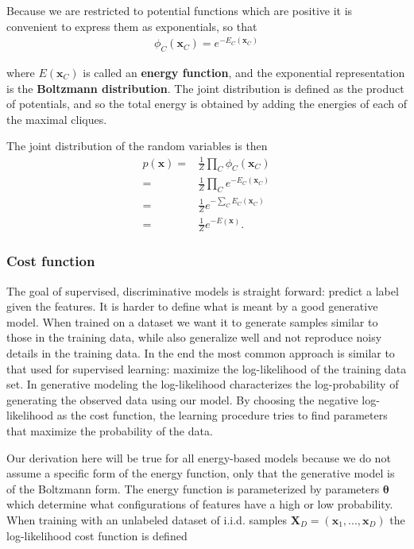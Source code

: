 \documentclass[twoside,english]{uiofysmaster}
\begin{document}
Because we are restricted to potential functions which are positive it is convenient to express them as exponentials, so that
\begin{align}
	\phi_C (\bm{x}_C) = e^{-E_C(\bm{x}_C)}
\end{align}

where $E(\bm{x}_C)$ is called an \textbf{energy function}, and the exponential representation is the \textbf{Boltzmann distribution}. The joint distribution is defined as the product of potentials, and so the total energy is obtained by adding the energies of each of the maximal cliques.

The joint distribution of the random variables is then
\begin{align}
	p(\bm{x}) =& \frac{1}{Z} \prod_C \phi_C (\bm{x}_C) \nonumber \\
	=& \frac{1}{Z} \prod_C e^{-E_C(\bm{x}_C)} \nonumber \\
	=& \frac{1}{Z} e^{-\sum_C E_C(\bm{x}_C)} \nonumber \\
	=& \frac{1}{Z} e^{-E(\bm{x})}.
\end{align} 


\subsubsection{Cost function}
\label{sec:UnsupervisedCostfunction}
The goal of supervised, discriminative models is straight forward: predict a label given the features. It is harder to define what is meant by a good generative model. When trained on a dataset we want it to generate samples similar to those in the training data, while also generalize well and not reproduce noisy details in the training data. In the end the most common approach is similar to that used for supervised learning: maximize the log-likelihood of the training data set. In generative modeling the log-likelihood characterizes the log-probability of generating the observed data using our model. By choosing the negative log-likelihood as the cost function, the learning procedure tries to find parameters that maximize the probability of the data. 



Our derivation here will be true for all energy-based models because we do not assume a specific form of the energy function, only that the generative model is of the Boltzmann form. The energy function is parameterized by parameters $\bm{\theta}$ which determine what configurations of features have a high or low probability. When training with an unlabeled dataset of i.i.d. samples $\bm{X}_D = (\bm{x}_1, ..., \bm{x}_D)$ the log-likelihood cost function is defined
\end{document}
